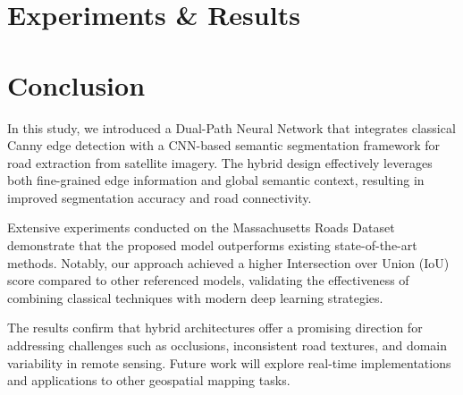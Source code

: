 \documentclass[conference]{IEEEtran}
\begin{document}
\section{Experiments \& Results}


\section{Conclusion}
In this study, we introduced a Dual-Path Neural Network that integrates classical Canny edge detection with a CNN-based semantic segmentation framework for road extraction from satellite imagery. The hybrid design effectively leverages both fine-grained edge information and global semantic context, resulting in improved segmentation accuracy and road connectivity.

Extensive experiments conducted on the Massachusetts Roads Dataset demonstrate that the proposed model outperforms existing state-of-the-art methods. Notably, our approach achieved a higher Intersection over Union (IoU) score compared to other referenced models, validating the effectiveness of combining classical techniques with modern deep learning strategies.

The results confirm that hybrid architectures offer a promising direction for addressing challenges such as occlusions, inconsistent road textures, and domain variability in remote sensing. Future work will explore real-time implementations and applications to other geospatial mapping tasks.
\end{document}
